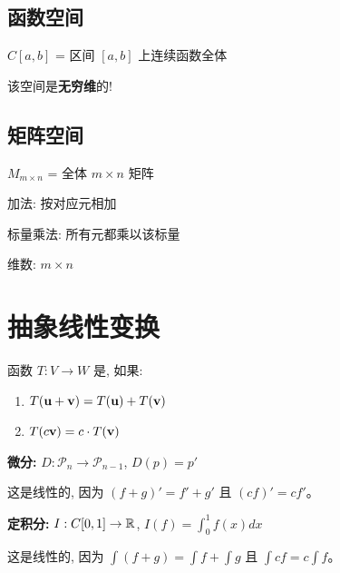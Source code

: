 \subsection{函数空间}

\begin{example}
$C[a,b]$ = 区间 $[a,b]$ 上连续函数全体

该空间是\textbf{无穷维}的!
\end{example}

\subsection{矩阵空间}

\begin{example}
$M_{m \times n}$ = 全体 $m \times n$ 矩阵

加法: 按对应元相加

标量乘法: 所有元都乘以该标量

维数: $m \times n$
\end{example}

\section{抽象线性变换}

\begin{definition}[空间之间的线性变换]
函数 $T: V \to W$ 是, 如果:
\begin{enumerate}
    \item $T(\mathbf{u} + \mathbf{v}) = T(\mathbf{u}) + T(\mathbf{v})$
    \item $T(c\mathbf{v}) = c \cdot T(\mathbf{v})$
\end{enumerate}
\end{definition}

\begin{example}
\textbf{微分:} $D: \mathcal{P}_n \to \mathcal{P}_{n-1}$, $D(p) = p'$

这是线性的, 因为 $(f + g)' = f' + g'$ 且 $(cf)' = cf'$。
\end{example}

\begin{example}
\textbf{定积分:} $I: C[0,1] \to \mathbb{R}$, $I(f) = \int_0^1 f(x) dx$

这是线性的, 因为 $\int(f+g) = \int f + \int g$ 且 $\int cf = c\int f$。
\end{example}

